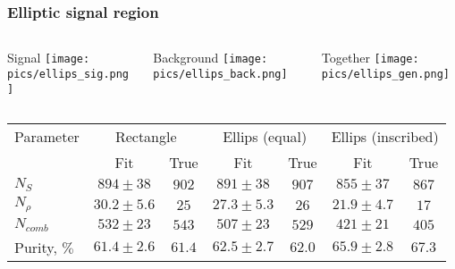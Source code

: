 \documentclass[10 pt,compress,mathserif]{beamer}
\begin{document}
\begin{frame}
 \frametitle{Elliptic signal region}
 \begin{small}
 \begin{columns}
  \begin{column}{0.33\textwidth}
  \begin{center}
   Signal
   \texttt{[image: pics/ellips\_sig.png]}
  \end{center}
  \end{column}
  \begin{column}{0.33\textwidth}
  \begin{center}
   Background
   \texttt{[image: pics/ellips\_back.png]}
  \end{center}
  \end{column}
  \begin{column}{0.33\textwidth}
  \begin{center}
   Together
   \texttt{[image: pics/ellips\_gen.png]}
  \end{center}
  \end{column}
 \end{columns}

 \begin{table}[bt]
 \small
 \begin{tabular}{|l|c|c|c|c|c|c|} \hline
  Parameter & \multicolumn{2}{c|}{Rectangle}& \multicolumn{2}{c|}{Ellips (equal)} & \multicolumn{2}{c|}{Ellips (inscribed)}\\ \hhline{~------}
            &      Fit   & True &      Fit   & True &  Fit       & True  \\ \hline
$N_S$       &$894\pm38$  &$902$ &$891\pm38$  &$907$ &$855\pm37$  & $867$ \\ \hline
$N_{\rho}$  &$30.2\pm5.6$&$25$  &$27.3\pm5.3$&$26$  &$21.9\pm4.7$& $17$  \\ \hline
$N_{comb}$  &$532 \pm 23$&$543$ &$507\pm23$  &$529$ &$421\pm21$  & $405$ \\ \hline
Purity, $\%$&$61.4\pm2.6$&$61.4$&$62.5\pm2.7$&$62.0$&$65.9\pm2.8$& $67.3$\\ \hline
 \end{tabular}
 \end{table}
 

\end{small}
\end{frame}
\end{document}

